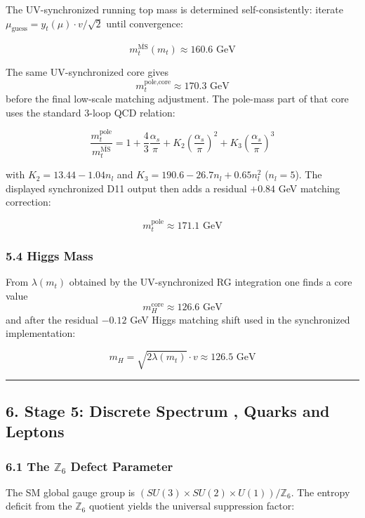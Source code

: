 The UV-synchronized running top mass is determined self-consistently: iterate \(\mu_{\text{guess}} = y_t(\mu) \cdot v/\sqrt{2}\) until convergence:

\[m_t^{\overline{\text{MS}}}(m_t) \approx 160.6 \text{ GeV}\]

The same UV-synchronized core gives
\[m_t^{\text{pole,core}} \approx 170.3 \text{ GeV}\]
before the final low-scale matching adjustment. The pole-mass part of that core uses the standard 3-loop QCD relation:

\[\frac{m_t^{\text{pole}}}{m_t^{\overline{\text{MS}}}} = 1 + \frac{4}{3}\frac{\alpha_s}{\pi} + K_2 \left(\frac{\alpha_s}{\pi}\right)^2 + K_3 \left(\frac{\alpha_s}{\pi}\right)^3\]

with \(K_2 = 13.44 - 1.04 n_l\) and \(K_3 = 190.6 - 26.7 n_l + 0.65 n_l^2\) (\(n_l = 5\)). The displayed synchronized D11 output then adds a residual \(+0.84\) GeV matching correction:

\[m_t^{\text{pole}} \approx 171.1 \text{ GeV}\]

\subsubsection{5.4 Higgs Mass}\label{54-higgs-mass}

From \(\lambda(m_t)\) obtained by the UV-synchronized RG integration one finds a core value
\[m_H^{\text{core}} \approx 126.6 \text{ GeV}\]
and after the residual \(-0.12\) GeV Higgs matching shift used in the synchronized implementation:

\[m_H = \sqrt{2\lambda(m_t)} \cdot v \approx 126.5 \text{ GeV}\]

\begin{center}\rule{0.5\linewidth}{0.5pt}\end{center}

\subsection{6. Stage 5: Discrete Spectrum , Quarks and Leptons}\label{6-stage-5-discrete-spectrum--quarks-and-leptons}

\subsubsection{\texorpdfstring{6.1 The \(\mathbb{Z}_6\) Defect Parameter}{6.1 The \textbackslash mathbb\{Z\}\_6 Defect Parameter}}\label{61-the-mathbbz_6-defect-parameter}

The SM global gauge group is \((SU(3) \times SU(2) \times U(1))/\mathbb{Z}_6\). The entropy deficit from the \(\mathbb{Z}_6\) quotient yields the universal suppression factor:

